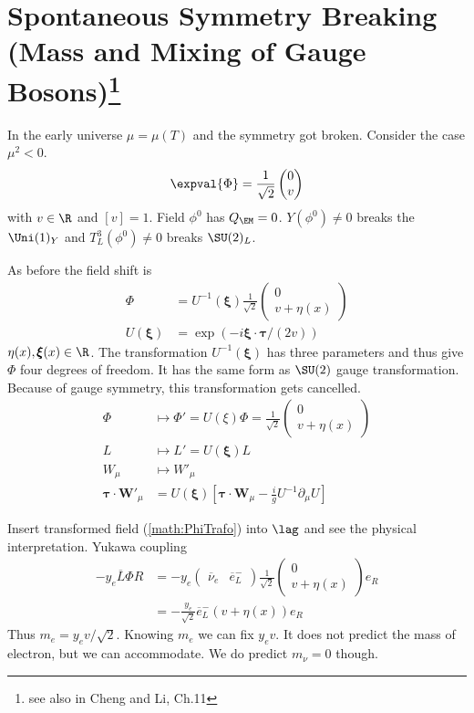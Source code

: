 \section[Spontaneous Symmetry Breaking (Mass and Mixing of Gauge Bosons)]{Spontaneous Symmetry Breaking (Mass and Mixing of Gauge Bosons)\footnote{see also in Cheng and Li, Ch.11}}
In the early universe $\mu = \mu(T)$ and the symmetry got broken. Consider the case $\mu^2 < 0$.
\begin{align}
   \expval{\Phi} = \frac{1}{\sqrt{2}} \begin{pmatrix} 0 \\ v \end{pmatrix}
\end{align}
with $v \in \R$ and $[v] = 1$. Field $\phi^0$ has $Q_\EM = 0$. $Y(\phi^0) \neq 0$ breaks the $\Uni(1)_Y$ and $T_L^3(\phi^0) \neq 0$ breaks $\SU(2)_L$.

As before the field shift is 
\begin{align*}
   \Phi &= U^{-1}(\pmb\xi) \frac{1}{\sqrt{2}} \begin{pmatrix} 0 \\ v+\eta(x) \end{pmatrix} \\
   U(\pmb\xi) &= \exp(-i \pmb\xi \cdot \pmb\tau / (2v))
\end{align*}
$\eta(x), \pmb{\xi}(x) \in \R$. The transformation $U^{-1}(\pmb \xi)$ has three parameters and thus give $\Phi$ four degrees of freedom. It has the same form as $\SU(2)$ gauge transformation. Because of gauge symmetry, this transformation gets cancelled. 
\begin{align}
   \Phi &\mapsto \Phi' = U(\xi) \Phi = \frac{1}{\sqrt{2}} \begin{pmatrix} 0 \\ v + \eta(x) \end{pmatrix} \label{math:PhiTrafo}\\ 
   L &\mapsto L' = U(\pmb\xi) L \\
   W_\mu &\mapsto W'_\mu \\
   \pmb\tau \cdot \pmb W'_\mu &= U(\pmb\xi) \left[ \pmb \tau \cdot \pmb{W}_\mu - \frac{i}{g} U^{-1}\partial_\mu U \right]
\end{align}

Insert transformed field (\ref{math:PhiTrafo}) into $\lag$ and see the physical interpretation. Yukawa coupling
\begin{align*}
   - y_e \overline{L} \Phi R &= - y_e \begin{pmatrix} \overline{\nu}_e & \overline{e}_L^- \end{pmatrix} \frac{1}{\sqrt{2}} \begin{pmatrix} 0 \\ v + \eta(x)\end{pmatrix} e_R \\
   &= - \frac{y_e}{\sqrt{2}} \overline{e}_L^- (v+\eta(x)) e_R
\end{align*}
Thus $m_e = y_e v / \sqrt{2}$. Knowing $m_e$ we can fix $y_e v$. It does not predict the mass of electron, but we can accommodate. We do predict $m_\nu = 0$ though.

